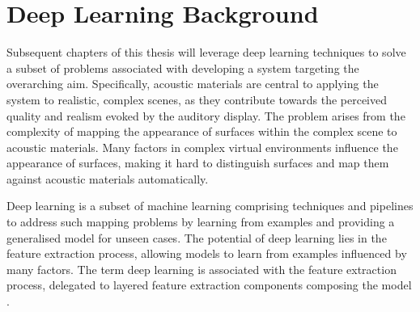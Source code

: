 \section{Deep Learning Background}
Subsequent chapters of this thesis will leverage deep learning techniques to solve a subset of problems associated with developing a system targeting the overarching aim. Specifically, acoustic materials are central to applying the system to realistic, complex scenes, as they contribute towards the perceived quality and realism evoked by the auditory display. The problem arises from the complexity of mapping the appearance of surfaces within the complex scene to acoustic materials. Many factors in complex virtual environments influence the appearance of surfaces, making it hard to distinguish surfaces and map them against acoustic materials automatically.\par
Deep learning is a subset of machine learning comprising techniques and pipelines to address such mapping problems by learning from examples and providing a generalised model for unseen cases. The potential of deep learning lies in the feature extraction process, allowing models to learn from examples influenced by many factors. The term deep learning is associated with the feature extraction process, delegated to layered feature extraction components composing the model \citep{dolhasz2021perceptually}.\par


